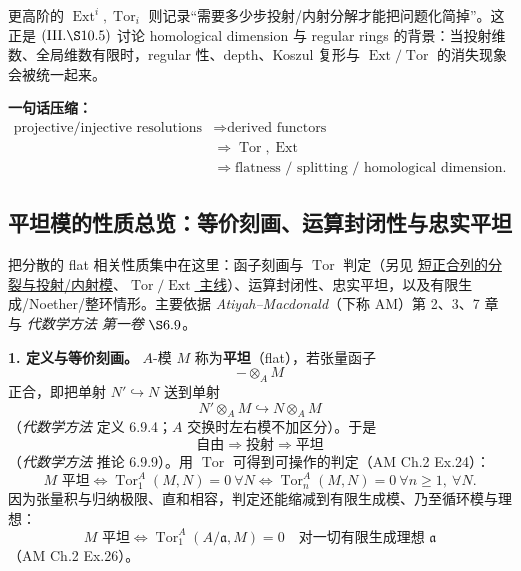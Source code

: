 \documentclass[a4paper]{ctexart}
\theoremstyle{definition}
\theoremstyle{analysis}
\theoremstyle{plain}
\begin{document}
更高阶的 \(\operatorname{Ext}^i,\operatorname{Tor}_i\) 则记录“需要多少步投射/内射分解才能把问题化简掉”。这正是 \((\mathrm{III.\S 10.5})\) 讨论 homological dimension 与 regular rings 的背景：当投射维数、全局维数有限时，regular 性、depth、Koszul 复形与 \(\operatorname{Ext}/\operatorname{Tor}\) 的消失现象会被统一起来。

\medskip

\textbf{一句话压缩：}
\[
  \begin{aligned}
    \text{projective/injective resolutions}
    &\Longrightarrow
    \text{derived functors} \\
    &\Longrightarrow
    \operatorname{Tor},\operatorname{Ext} \\
    &\Longrightarrow
    \text{flatness / splitting / homological dimension}.
  \end{aligned}
\]

\subsection{\texorpdfstring{平坦模的性质总览：等价刻画、运算封闭性与忠实平坦}{平坦模的性质总览}}\label{subsec:topic-flat-modules}

把分散的 flat 相关性质集中在这里：函子刻画与 \(\operatorname{Tor}\) 判定（另见 \hyperref[subsec:split-projective-injective]{短正合列的分裂与投射/内射模}、\hyperref[subsec:topic-derived-functors]{\(\operatorname{Tor}/\operatorname{Ext}\) 主线}）、运算封闭性、忠实平坦，以及有限生成/Noether/整环情形。主要依据 \textit{Atiyah--Macdonald}（下称 AM）第 2、3、7 章与 \textit{代数学方法 第一卷} \(\S 6.9\)。

\medskip

\textbf{1. 定义与等价刻画。}
\(A\)-模 \(M\) 称为\textbf{平坦}（flat），若张量函子
\[
  -\otimes_A M
\]
正合，即把单射 \(N'\hookrightarrow N\) 送到单射
\[
  N'\otimes_A M\hookrightarrow N\otimes_A M
\]
（\textit{代数学方法} 定义 6.9.4；\(A\) 交换时左右模不加区分）。于是
\[
  \text{自由}\Rightarrow\text{投射}\Rightarrow\text{平坦}
\]
（\textit{代数学方法} 推论 6.9.9）。用 \(\operatorname{Tor}\) 可得到可操作的判定（AM Ch.2 Ex.24）：
\[
  M\text{ 平坦}
  \iff
  \operatorname{Tor}_1^A(M,N)=0\ \forall N
  \iff
  \operatorname{Tor}_n^A(M,N)=0\ \forall n\ge1,\ \forall N.
\]
因为张量积与归纳极限、直和相容，判定还能缩减到有限生成模、乃至循环模与理想：
\[
  M\text{ 平坦}
  \iff
  \operatorname{Tor}_1^A(A/\mathfrak a,M)=0\quad
  \text{对一切有限生成理想 }\mathfrak a
\]
（AM Ch.2 Ex.26）。

\medskip
\end{document}
